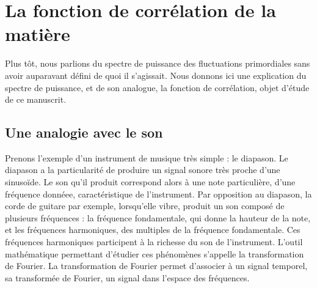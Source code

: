 \documentclass[11pt, twoside, a4paper, openright]{report}
\begin{document}
\section{La fonction de corrélation de la matière}

Plus tôt, nous parlions du spectre de puissance des fluctuations primordiales sans avoir auparavant défini de quoi il s'agissait. Nous donnons ici une explication du spectre de puissance, et de son analogue, la fonction de corrélation, objet d'étude de ce manuscrit.

\subsection{Une analogie avec le son}

Prenons l'exemple d'un instrument de musique très simple : le diapason.
Le diapason a la particularité de produire un signal sonore très proche d'une sinusoïde. Le son qu'il produit correspond alors à une note particulière, d'une fréquence donnéee, caractéristique de l'instrument. Par opposition au diapason, la corde de guitare par exemple, lorsqu'elle vibre, produit un son composé de plusieurs fréquences : la fréquence fondamentale, qui donne la hauteur de la note, et les fréquences harmoniques, des multiples de la fréquence fondamentale. Ces fréquences harmoniques participent à la richesse du son de l'instrument. L'outil mathématique permettant d'étudier ces phénomènes s'appelle la transformation de Fourier. La transformation de Fourier permet d'associer à un signal temporel, sa transformée de Fourier, un signal dans l'espace des fréquences.
\end{document}

